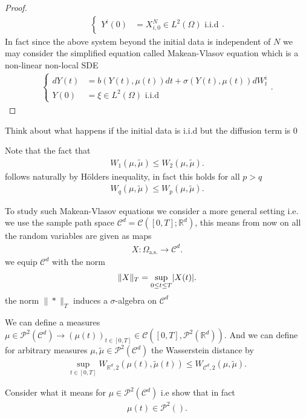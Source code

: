 \begin{proof}
\begin{align*}
\begin{cases}
      Y^{i}(0)  &=  X_{i,0}^{N} \in  L^2(\Omega ) \text{ i.i.d} 
    \end{cases}
  .\end{align*}
  In fact since the above system beyond the initial data is independent of $N$ we may consider the simplified equation
  called Makean-Vlasov equation which is a non-linear non-local SDE
  \begin{align*}
    \begin{cases}
      dY(t) &= b(Y(t) ,\mu(t) ) dt + \sigma(Y(t),\mu(t) )dW_t^i \\
      Y(0)  &=  \xi \in  L^2(\Omega ) \text{ i.i.d} 
    \end{cases}
  .\end{align*}
\end{proof}
\begin{exercise}
 Think about what happens if the initial data is i.i.d but the diffusion term is 0 
\end{exercise}
\begin{remark}
 Note that the fact that 
 \begin{align*}
   W_1(\mu ,\tilde{\mu } ) \le  W_{2}(\mu ,\tilde{\mu } )
 .\end{align*}
 follows naturally by Hölders inequality, in fact this holds for all $p>q$
  \begin{align*}
   W_q(\mu ,\tilde{\mu } ) \le  W_{p}(\mu ,\tilde{\mu } )
 .\end{align*}
\end{remark}
\begin{remark}
 To study such Makean-Vlasov equations we consider a more general setting i.e. 
 we use the sample path space $\mathcal{C}^{d} = \mathcal{C}([0,T];\mathbb{R}^{d} ) $, this means from now on
 all the random variables are given as maps 
 \begin{align*}
   X : \Omega_{\text{a.s.}}  \to  \mathcal{C}^{d} 
 .\end{align*}
 we equip $\mathcal{C}^{d} $ with the norm 
 \begin{align*}
   \|X\|_{T} =  \sup_{0\le t\le T} \lvert X(t)\rvert
 .\end{align*}
 the norm $\|*\|_T$ induces a $\sigma$-algebra on $\mathcal{C}^{d} $
\end{remark}
We can define a measures $\mu  \in  \mathcal{P}^2(\mathcal{C}^{d} ) \to  (\mu(t))_{t \in  [0,T]} \in  \mathcal{C}([0,T],\mathcal{P}^2(\mathbb{R}^{d} ))$.
And we can define for arbitrary measures $\mu ,\tilde{\mu } \in  \mathcal{P}^2(\mathcal{C}^{d} ) $ the Wasserstein distance by
\begin{align*}
  \sup_{t \in  [0,T]} W_{\mathbb{R}^{d},2 }(\mu(t),\tilde{\mu }(t) ) \le  W_{\mathcal{C}^{d},2 } (\mu ,\tilde{\mu } )
.\end{align*}
\begin{exercise}
 Consider what it means for $\mu  \in  \mathcal{P}^2(\mathcal{C}^{d} )$  i.e show that in fact 
 \begin{align*}
  \mu(t) \in  \mathcal{P}^2()
 .\end{align*}
\end{exercise}
